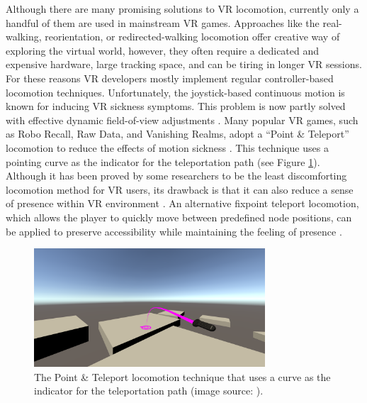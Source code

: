Although there are many promising solutions to VR locomotion, currently only a handful of them are used in mainstream VR games. Approaches like the real-walking, reorientation, or redirected-walking locomotion offer creative way of exploring the virtual world, however, they often require a dedicated and expensive hardware, large tracking space, and can be tiring in longer VR sessions. For these reasons VR developers mostly implement regular controller-based locomotion techniques. Unfortunately, the joystick-based continuous motion is known for inducing VR sickness symptoms. This problem is now partly solved with effective dynamic field-of-view adjustments \cite{DYNAMICFOD}. Many popular VR games, such as Robo Recall, Raw Data, and Vanishing Realms, adopt a ``Point \& Teleport'' locomotion to reduce the effects of motion sickness \cite{TELEPORTATIONGAMES}. This technique uses a pointing curve as the indicator for the teleportation path (see Figure \ref{fig:TELEPORTATIONCURVEIMAGE}). Although it has been proved by some researchers to be the least discomforting locomotion method for VR users, its drawback is that it can also reduce a sense of presence within VR environment \cite{TELEPORTATIONEFFECTS}. An alternative fixpoint teleport locomotion, which allows the player to quickly move between predefined node positions, can be applied to preserve accessibility while maintaining the feeling of presence \cite{NODEBASEDTELEPORTATION}.

\begin{figure}[th]
\centering
\includegraphics[width=0.77\textwidth]{img/teleportation_curve.png}
\caption{The Point \& Teleport locomotion technique that uses a curve as the indicator for the teleportation path (image source: \cite{TELEPORTATIONCURVE}).}
\label{fig:TELEPORTATIONCURVEIMAGE}
\end{figure}

